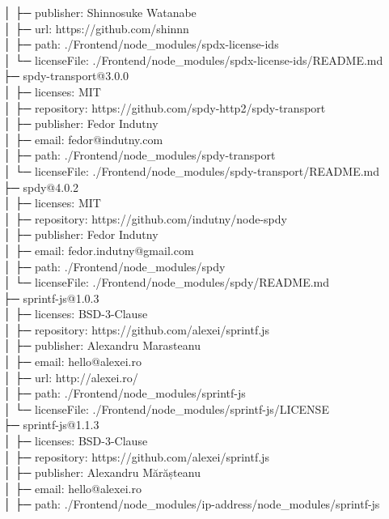 │  ├─ publisher: Shinnosuke Watanabe\\
│  ├─ url: https://github.com/shinnn\\
│  ├─ path: ./Frontend/node\_modules/spdx-license-ids\\
│  └─ licenseFile: ./Frontend/node\_modules/spdx-license-ids/README.md\\
├─ spdy-transport@3.0.0\\
│  ├─ licenses: MIT\\
│  ├─ repository: https://github.com/spdy-http2/spdy-transport\\
│  ├─ publisher: Fedor Indutny\\
│  ├─ email: fedor@indutny.com\\
│  ├─ path: ./Frontend/node\_modules/spdy-transport\\
│  └─ licenseFile: ./Frontend/node\_modules/spdy-transport/README.md\\
├─ spdy@4.0.2\\
│  ├─ licenses: MIT\\
│  ├─ repository: https://github.com/indutny/node-spdy\\
│  ├─ publisher: Fedor Indutny\\
│  ├─ email: fedor.indutny@gmail.com\\
│  ├─ path: ./Frontend/node\_modules/spdy\\
│  └─ licenseFile: ./Frontend/node\_modules/spdy/README.md\\
├─ sprintf-js@1.0.3\\
│  ├─ licenses: BSD-3-Clause\\
│  ├─ repository: https://github.com/alexei/sprintf.js\\
│  ├─ publisher: Alexandru Marasteanu\\
│  ├─ email: hello@alexei.ro\\
│  ├─ url: http://alexei.ro/\\
│  ├─ path: ./Frontend/node\_modules/sprintf-js\\
│  └─ licenseFile: ./Frontend/node\_modules/sprintf-js/LICENSE\\
├─ sprintf-js@1.1.3\\
│  ├─ licenses: BSD-3-Clause\\
│  ├─ repository: https://github.com/alexei/sprintf.js\\
│  ├─ publisher: Alexandru Mărășteanu\\
│  ├─ email: hello@alexei.ro\\
│  ├─ path: ./Frontend/node\_modules/ip-address/node\_modules/sprintf-js\\
